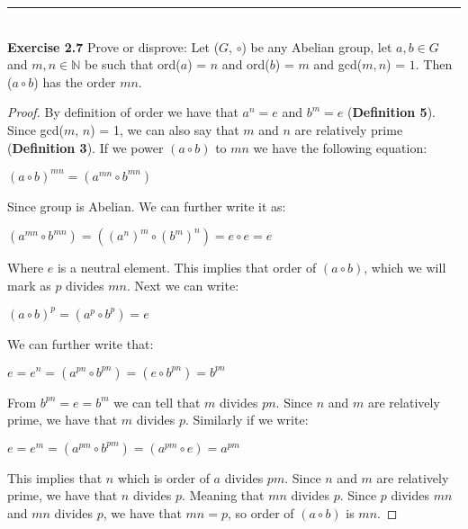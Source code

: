 \documentclass[a4paper]{article}
\begin{document}
\noindent\rule{12cm}{0.4pt}\\
\noindent \textbf{Exercise 2.7} Prove or disprove: Let ($G$, $\circ$) be any Abelian group, let $a, b \in G$ and $m,n \in \mathbb{N}$ be such that ord($a$) = $n$ and ord($b$) = $m$ and gcd($m,n$) = $1$. Then ($a \circ b$) has the order $mn$.
\begin{proof}
By definition of order we have that $a^n=e$ and $b^m=e$ (\textbf{Definition 5}). Since gcd($m$, $n$) = 1, we can also say that $m$ and $n$ are relatively prime (\textbf{Definition 3}). If we power $(a \circ b)$ to $mn$ we have the following equation:
\begin{center}
$(a \circ b)^{mn}=(a^{mn} \circ b^{mn})$
\end{center}
Since group is Abelian. We can further write it as:
\begin{center}
$(a^{mn} \circ b^{mn})=((a^n)^m \circ (b^m)^n)=e \circ e=e$
\end{center}
Where $e$ is a neutral element. This implies that order of $(a \circ b)$, which we will mark as $p$ divides $mn$. Next we can write:
\begin{center}
$(a \circ b)^p=(a^{p} \circ b^{p})=e$
\end{center}
\begin{samepage}
We can further write that:
\begin{center}
$e=e^n=(a^{pn} \circ b^{pn})= (e \circ b^{pn}) =b^{pn}$
\end{center}
\end{samepage}
From $b^{pn}=e=b^m$ we can tell that $m$ divides $pn$. Since $n$ and $m$ are relatively prime, we have that $m$ divides $p$. Similarly if we write:
\begin{center}
$e = e^m=(a^{pm} \circ b^{pm})= (a^{pm} \circ e) =a^{pm}$
\end{center}
This implies that $n$ which is order of $a$ divides $pm$. Since $n$ and $m$ are relatively prime, we have that $n$ divides $p$. Meaning that $mn$ divides $p$. Since $p$ divides $mn$ and $mn$ divides $p$, we have that $mn=p$, so order of $(a \circ b)$ is $mn$.
\end{proof}
\end{document}
